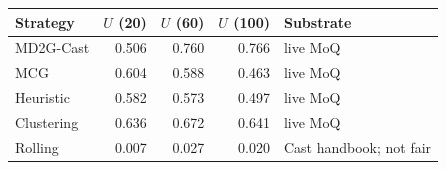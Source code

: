 \begin{tabular}{lrrrl}
\hline
Strategy & $U$ (20) & $U$ (60) & $U$ (100) & Substrate \\
\hline
MD2G-Cast & 0.506 & 0.760 & 0.766 & live MoQ \\
MCG & 0.604 & 0.588 & 0.463 & live MoQ \\
Heuristic & 0.582 & 0.573 & 0.497 & live MoQ \\
Clustering & 0.636 & 0.672 & 0.641 & live MoQ \\
Rolling & 0.007 & 0.027 & 0.020 & Cast handbook; not fair \\
\hline
\end{tabular}
